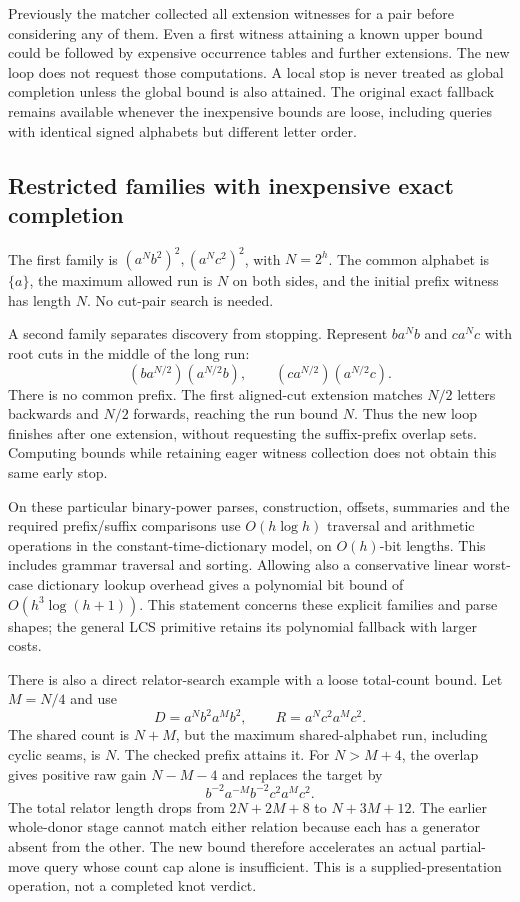 Previously the matcher collected all extension witnesses for a pair
before considering any of them. Even a first witness attaining a known
upper bound could be followed by expensive occurrence tables and further
extensions. The new loop does not request those computations. A local
stop is never treated as global completion unless the global bound is
also attained. The original exact fallback remains available whenever
the inexpensive bounds are loose, including queries with identical signed
alphabets but different letter order.

\subsection{Restricted families with inexpensive exact completion}

The first family is $(a^N b^2)^2,(a^N c^2)^2$, with $N=2^h$. The common
alphabet is $\{a\}$, the maximum allowed run is $N$ on both sides, and
the initial prefix witness has length $N$. No cut-pair search is needed.

A second family separates discovery from stopping. Represent
$b a^N b$ and $c a^N c$ with root cuts in the middle of the long run:
\[
 (b a^{N/2})(a^{N/2}b),\qquad
 (c a^{N/2})(a^{N/2}c).
\]
There is no common prefix. The first aligned-cut extension matches
$N/2$ letters backwards and $N/2$ forwards, reaching the run bound $N$.
Thus the new loop finishes after one extension, without requesting the
suffix-prefix overlap sets. Computing bounds while retaining eager
witness collection does not obtain this same early stop.

On these particular binary-power parses, construction, offsets, summaries
and the required prefix/suffix comparisons use $O(h\log h)$ traversal
and arithmetic operations in the constant-time-dictionary model, on
$O(h)$-bit lengths. This includes grammar traversal and sorting. Allowing
also a conservative linear worst-case dictionary lookup overhead gives
a polynomial bit bound of $O(h^3\log(h+1))$. This statement concerns
these explicit families and parse shapes; the general LCS primitive
retains its polynomial fallback with larger costs.

There is also a direct relator-search example with a loose total-count
bound. Let $M=N/4$ and use
\[
 D=a^N b^2 a^M b^2,\qquad R=a^N c^2 a^M c^2.
\]
The shared count is $N+M$, but the maximum shared-alphabet run, including
cyclic seams, is $N$. The checked prefix attains it. For $N>M+4$, the
overlap gives positive raw gain $N-M-4$ and replaces the target by
\[
 b^{-2}a^{-M}b^{-2}c^2a^Mc^2.
\]
The total relator length drops from $2N+2M+8$ to $N+3M+12$.
The earlier whole-donor stage cannot match either relation because each
has a generator absent from the other. The new bound therefore accelerates
an actual partial-move query whose count cap alone is insufficient.
This is a supplied-presentation operation, not a completed knot verdict.

